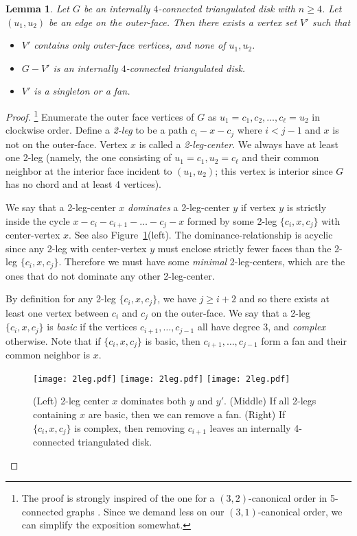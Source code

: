 \documentclass[12pt]{article}
\newtheorem{lemma}{Lemma}
\begin{document}
\begin{lemma}
\label{lem:find}
Let $G$ be an internally $4$-connected triangulated disk with $n\geq 4$.  
Let $(u_1,u_2)$ be an edge on the outer-face. 
Then there exists a vertex set $V'$ such that
\begin{itemize}
\item $V'$ contains only outer-face vertices, and none of $u_1,u_2$.
\item $G-V'$ is an internally $4$-connected triangulated disk.
\item $V'$ is a singleton or a fan.
\end{itemize}
\end{lemma}


\begin{proof}
\footnote{The proof is strongly inspired of the one 
for a $(3,2)$-canonical order in 5-connected graphs \cite{NN00}.
Since we demand
less on our $(3,1)$-canonical order, we can simplify the exposition
somewhat.}
Enumerate the outer face vertices of $G$ as $u_1=c_1,c_2,\dots,c_\ell=u_2$ in
clockwise order.  Define a {\em 2-leg} to be a path $c_i-x-c_j$ where
$i<j-1$ and $x$ is not on the outer-face.
Vertex $x$ is called a {\em 2-leg-center}.  We always have at least one
2-leg (namely, the one consisting of $u_1=c_1,u_2=c_\ell$ and their common 
neighbor at the interior face incident to $(u_1,u_2)$; this vertex is 
interior since $G$ has no chord and at least 4 vertices).

We say that a 2-leg-center $x$ {\em dominates} a 2-leg-center $y$ if vertex
$y$ is strictly inside the cycle $x-c_i-c_{i+1}-\dots-c_j-x$ formed by 
some 2-leg $\{c_i,x,c_j\}$ with center-vertex $x$.  See also
Figure~\ref{fig:2leg}(left).
The dominance-relationship 
is acyclic since any 2-leg with center-vertex $y$ must enclose strictly 
fewer faces than the 2-leg $\{c_i,x,c_j\}$.  Therefore we must have some
{\em minimal} 2-leg-centers, which are the ones that do not dominate any
other 2-leg-center.

By definition for any 2-leg $\{c_i,x,c_j\}$, we have $j\geq i+2$ and so 
there exists at least one vertex between $c_i$ and $c_j$
on the outer-face.  
We say that a 2-leg $\{c_i,x,c_j\}$ is {\em basic} if the vertices
$c_{i+1},\dots,c_{j-1}$ all have degree 3, and {\em complex} otherwise.
Note that if $\{c_i,x,c_j\}$ is basic, then $c_{i+1},\dots,c_{j-1}$ form
a fan and their common neighbor is $x$.

\begin{figure}[ht]
\hspace*{\fill}
\texttt{[image: 2leg.pdf]}
\hspace*{\fill}
\texttt{[image: 2leg.pdf]}
\hspace*{\fill}
\texttt{[image: 2leg.pdf]}
\hspace*{\fill}
\caption{(Left) 2-leg center $x$ dominates both $y$ and $y'$.
(Middle)  If all 2-legs containing $x$ are basic, then we can remove a fan.
(Right) If $\{c_i,x,c_j\}$ is complex, then removing $c_{i+1}$ leaves
an internally 4-connected triangulated disk.}
\label{fig:2leg}
\end{figure}


\end{proof}
\end{document}
